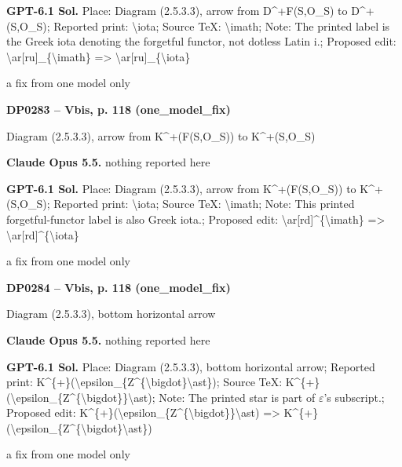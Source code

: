 \textbf{GPT-6.1 Sol.} Place: Diagram (2.5.3.3), arrow from D\textasciicircum{}+F(S,O\_S) to D\textasciicircum{}+(S,O\_S); Reported print: \textbackslash{}iota; Source TeX: \textbackslash{}imath; Note: The printed label is the Greek iota denoting the forgetful functor, not dotless Latin i.; Proposed edit: \textbackslash{}ar[ru]\_\{\textbackslash{}imath\} =\allowbreak > \textbackslash{}ar[ru]\_\{\textbackslash{}iota\}\par
a fix from one model only\par
\par\noindent\hypertarget{DP0283}{}\textbf{DP0283 -- Vbis, p. 118 (one\_model\_fix)}\par
Diagram (2.5.3.3), arrow from K\textasciicircum{}+(F(S,O\_S)) to K\textasciicircum{}+(S,O\_S)\par
\textbf{Claude Opus 5.5.} nothing reported here\par
\textbf{GPT-6.1 Sol.} Place: Diagram (2.5.3.3), arrow from K\textasciicircum{}+(F(S,O\_S)) to K\textasciicircum{}+(S,O\_S); Reported print: \textbackslash{}iota; Source TeX: \textbackslash{}imath; Note: This printed forgetful-functor label is also Greek iota.; Proposed edit: \textbackslash{}ar[rd]\textasciicircum{}\{\textbackslash{}imath\} =\allowbreak > \textbackslash{}ar[rd]\textasciicircum{}\{\textbackslash{}iota\}\par
a fix from one model only\par
\par\noindent\hypertarget{DP0284}{}\textbf{DP0284 -- Vbis, p. 118 (one\_model\_fix)}\par
Diagram (2.5.3.3), bottom horizontal arrow\par
\textbf{Claude Opus 5.5.} nothing reported here\par
\textbf{GPT-6.1 Sol.} Place: Diagram (2.5.3.3), bottom horizontal arrow; Reported print: K\textasciicircum{}\{+\}(\textbackslash{}epsilon\_\{Z\textasciicircum{}\{\textbackslash{}bigdot\}\textbackslash{}ast\}); Source TeX: K\textasciicircum{}\{+\}(\textbackslash{}epsilon\_\{Z\textasciicircum{}\{\textbackslash{}bigdot\}\}\textbackslash{}ast); Note: The printed star is part of \ensuremath{\varepsilon}'s subscript.; Proposed edit: K\textasciicircum{}\{+\}(\textbackslash{}epsilon\_\{Z\textasciicircum{}\{\textbackslash{}bigdot\}\}\textbackslash{}ast) =\allowbreak > K\textasciicircum{}\{+\}(\textbackslash{}epsilon\_\{Z\textasciicircum{}\{\textbackslash{}bigdot\}\textbackslash{}ast\})\par
a fix from one model only\par
